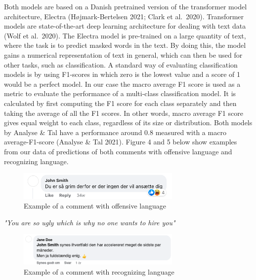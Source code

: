 \documentclass[
]{article}
\begin{document}
Both models are based on a Danish pretrained version of the transformer
model architecture, Electra (Højmark-Bertelsen 2021; Clark et al.~2020).
Transformer models are state-of-the-art deep learning architecture for
dealing with text data (Wolf et al.~2020). The Electra model is
pre-trained on a large quantity of text, where the task is to predict
masked words in the text. By doing this, the model gains a numerical
representation of text in general, which can then be used for other
tasks, such as classification. A standard way of evaluating
classification models is by using F1-scores in which zero is the lowest
value and a score of 1 would be a perfect model. In our case the macro
average F1 score is used as a metric to evaluate the performance of a
multi-class classification model. It is calculated by first computing
the F1 score for each class separately and then taking the average of
all the F1 scores. In other words, macro average F1 score gives equal
weight to each class, regardless of its size or distribution. Both
models by Analyse \& Tal have a performance around 0.8 measured with a
macro average-F1-score (Analyse \& Tal 2021). Figure 4 and 5 below show
examples from our data of predictions of both comments with offensive
language and recognizing language.

\begin{figure}[H]

{\centering \includegraphics[width=300px]{images/offensive_language} 

}

\caption{Example of a comment with offensive language}\label{fig:offensive_example}
\end{figure}

\begin{center}
\small
\emph{"You are so ugly which is why no one wants to hire you"}
\end{center}
\normalsize

\begin{figure}[H]

{\centering \includegraphics[width=300px]{images/recognizing_language} 

}

\caption{Example of a comment with recognizing language}\label{fig:recognition_example}
\end{figure}
\end{document}
